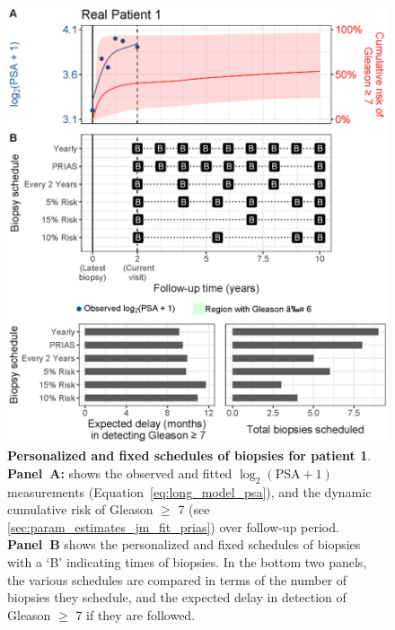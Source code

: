 \begin{figure}
\centerline{\includegraphics[width=\columnwidth]{images/demo_pat1_supp.eps}}
\caption{\textbf{Personalized and fixed schedules of biopsies for patient 1}. \textbf{Panel~A:} shows the observed and fitted $\log_2(\mbox{PSA} + 1)$ measurements (Equation~\ref{eq:long_model_psa}), and the dynamic cumulative risk of Gleason $\geq$ 7 (see \ref{sec:param_estimates_jm_fit_prias}) over follow-up period. \textbf{Panel~B} shows the personalized and fixed schedules of biopsies with a `B' indicating times of biopsies. In the bottom two panels, the various schedules are compared in terms of the number of biopsies they schedule, and the expected delay in detection of Gleason $\geq$ 7 if they are followed.}
\label{fig:demo_pat1_supp}
\end{figure}

